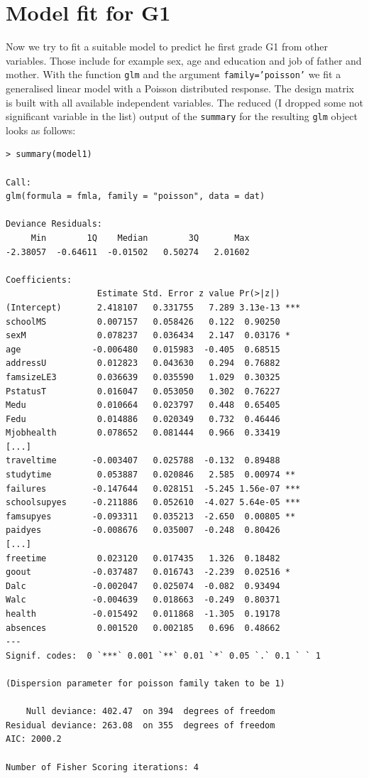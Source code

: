 \section{Model fit for G1}
Now we try to fit a suitable model to predict he first grade G1 from other variables. Those include for example sex, age and education and job of father and mother. With the function \texttt{glm} and the argument \texttt{family='poisson'} we fit a generalised linear model with a Poisson distributed response. The design matrix is built with all available independent variables. The reduced (I dropped some not significant variable in the list) output of the \texttt{summary} for the resulting \texttt{glm} object looks as follows:
\begin{small}\begin{verbatim} 
> summary(model1)

Call:
glm(formula = fmla, family = "poisson", data = dat)

Deviance Residuals: 
     Min        1Q    Median        3Q       Max  
-2.38057  -0.64611  -0.01502   0.50274   2.01602  

Coefficients:
                  Estimate Std. Error z value Pr(>|z|)    
(Intercept)       2.418107   0.331755   7.289 3.13e-13 ***
schoolMS          0.007157   0.058426   0.122  0.90250    
sexM              0.078237   0.036434   2.147  0.03176 *  
age              -0.006480   0.015983  -0.405  0.68515    
addressU          0.012823   0.043630   0.294  0.76882    
famsizeLE3        0.036639   0.035590   1.029  0.30325    
PstatusT          0.016047   0.053050   0.302  0.76227    
Medu              0.010664   0.023797   0.448  0.65405    
Fedu              0.014886   0.020349   0.732  0.46446    
Mjobhealth        0.078652   0.081444   0.966  0.33419    
[...]
traveltime       -0.003407   0.025788  -0.132  0.89488    
studytime         0.053887   0.020846   2.585  0.00974 ** 
failures         -0.147644   0.028151  -5.245 1.56e-07 ***
schoolsupyes     -0.211886   0.052610  -4.027 5.64e-05 ***
famsupyes        -0.093311   0.035213  -2.650  0.00805 ** 
paidyes          -0.008676   0.035007  -0.248  0.80426    
[...]
freetime          0.023120   0.017435   1.326  0.18482    
goout            -0.037487   0.016743  -2.239  0.02516 *  
Dalc             -0.002047   0.025074  -0.082  0.93494    
Walc             -0.004639   0.018663  -0.249  0.80371    
health           -0.015492   0.011868  -1.305  0.19178    
absences          0.001520   0.002185   0.696  0.48662    
---
Signif. codes:  0 `***` 0.001 `**` 0.01 `*` 0.05 `.` 0.1 ` ` 1

(Dispersion parameter for poisson family taken to be 1)

    Null deviance: 402.47  on 394  degrees of freedom
Residual deviance: 263.08  on 355  degrees of freedom
AIC: 2000.2

Number of Fisher Scoring iterations: 4
\end{verbatim}\end{small}  


